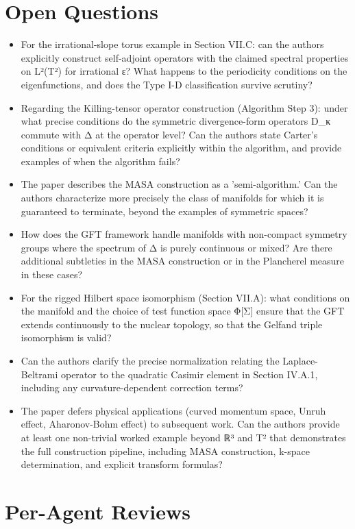 \documentclass[11pt]{article}
\begin{document}
\section*{Open Questions}
\begin{itemize}[leftmargin=*]
  \item For the irrational-slope torus example in Section VII.C: can the authors explicitly construct self-adjoint operators with the claimed spectral properties on L²(T²) for irrational ε? What happens to the periodicity conditions on the eigenfunctions, and does the Type I-D classification survive scrutiny?
  \item Regarding the Killing-tensor operator construction (Algorithm Step 3): under what precise conditions do the symmetric divergence-form operators D\_κ commute with Δ at the operator level? Can the authors state Carter's conditions or equivalent criteria explicitly within the algorithm, and provide examples of when the algorithm fails?
  \item The paper describes the MASA construction as a 'semi-algorithm.' Can the authors characterize more precisely the class of manifolds for which it is guaranteed to terminate, beyond the examples of symmetric spaces?
  \item How does the GFT framework handle manifolds with non-compact symmetry groups where the spectrum of Δ is purely continuous or mixed? Are there additional subtleties in the MASA construction or in the Plancherel measure in these cases?
  \item For the rigged Hilbert space isomorphism (Section VII.A): what conditions on the manifold and the choice of test function space Φ[Σ] ensure that the GFT extends continuously to the nuclear topology, so that the Gelfand triple isomorphism is valid?
  \item Can the authors clarify the precise normalization relating the Laplace-Beltrami operator to the quadratic Casimir element in Section IV.A.1, including any curvature-dependent correction terms?
  \item The paper defers physical applications (curved momentum space, Unruh effect, Aharonov-Bohm effect) to subsequent work. Can the authors provide at least one non-trivial worked example beyond ℝ³ and T² that demonstrates the full construction pipeline, including MASA construction, k-space determination, and explicit transform formulas?
\end{itemize}

\section*{Per-Agent Reviews}
\end{document}

